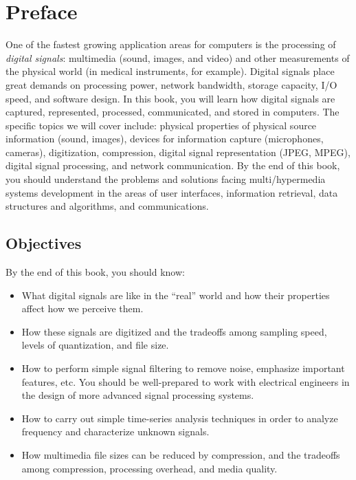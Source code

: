 
%
%
%
%
%

\chapter*{Preface}


One of the fastest growing application areas for
computers is the processing of \emph{digital signals}: multimedia
(sound, images, and video) and other measurements of the physical
world (in medical instruments, for example). Digital signals place
great demands on processing power, network bandwidth, storage
capacity, I/O speed, and software design. In this book, you will
learn how digital signals are captured, represented, processed,
communicated, and stored in computers. The specific topics we will
cover include: physical properties of physical source information
(sound, images), devices for information capture (microphones,
cameras), digitization, compression, digital signal representation
(JPEG, MPEG), digital signal processing, and network communication.
By the end of this book, you should understand the problems and
solutions facing multi/hypermedia systems development in the areas of
user interfaces, information retrieval, data structures and
algorithms, and communications.

\section*{Objectives}

By the end of this book, you should know:

\begin{itemize}
\item What digital signals are like in the ``real'' world and how
their properties affect how we perceive them.
\item How these signals are digitized and the tradeoffs among
sampling speed, levels of quantization, and file size.
\item How to perform simple signal filtering to remove noise,
emphasize important features, etc.  You should be well-prepared to
work with electrical engineers in the design of more advanced signal
processing systems.
\item How to carry out simple time-series analysis techniques in order to 
analyze frequency and characterize unknown signals.
\item How multimedia file sizes can be reduced by compression, and the 
tradeoffs among compression, processing overhead, and media quality.
\end{itemize}

